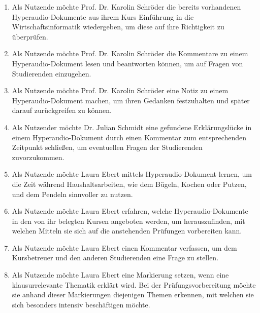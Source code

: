 \begin{enumerate}[label=US-\arabic*:,ref=US-\arabic*]
\item \label{US-Wiedergabe} Als Nutzende möchte Prof. Dr. Karolin Schröder die bereits vorhandenen Hyperaudio-Dokumente aus ihrem Kurs \glqq Einführung in die Wirtschaftsinformatik\grqq{} wiedergeben, um diese auf ihre Richtigkeit zu überprüfen.

\item \label{US-Antwort-L} Als Nutzende möchte Prof. Dr. Karolin Schröder die Kommentare zu einem Hyperaudio-Dokument lesen und beantworten können, um auf Fragen von Studierenden einzugehen.

\item \label{US-Notiz-L} Als Nutzende möchte Prof. Dr. Karolin Schröder eine Notiz zu einem Hyperaudio-Dokument machen, um ihren Gedanken festzuhalten und später darauf zurückgreifen zu können.

\item \label{US-Kommentar-L} Als Nutzender möchte Dr. Julian Schmidt eine gefundene Erklärungslücke in einem Hyperaudio-Dokument durch einen Kommentar zum entsprechenden Zeitpunkt schließen, um eventuellen Fragen der Studierenden zuvorzukommen.


\item \label{US-Zeit} Als Nutzende möchte Laura Ebert mittels Hyperaudio-Dokument lernen, um die Zeit während Haushaltsarbeiten, wie dem Bügeln, Kochen oder Putzen, und dem Pendeln sinnvoller zu nutzen.

\item \label{US-Uebersicht-Kurse} Als Nutzende möchte Laura Ebert erfahren, welche Hyperaudio-Dokumente in den von ihr belegten Kursen angeboten werden, um herauszufinden, mit welchen Mitteln sie sich auf die anstehenden Prüfungen vorbereiten kann.

\item \label{US-Kommentar-S} Als Nutzende möchte Laura Ebert einen Kommentar verfassen, um dem Kursbetreuer und den anderen Studierenden eine Frage zu stellen.

\item \label{US-Markierung} Als Nutzende möchte Laura Ebert eine Markierung setzen, wenn eine klausurrelevante Thematik erklärt wird. Bei der Prüfungsvorbereitung möchte sie anhand dieser Markierungen diejenigen Themen erkennen, mit welchen sie sich besonders intensiv beschäftigen möchte.


\end{enumerate}
